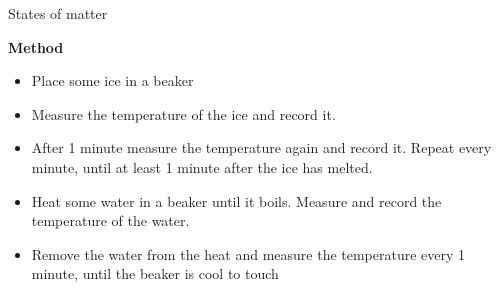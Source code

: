 \begin{fexperiment}{States of matter}
{\label{m38736*eip-862}\noindent{}\textbf{Method}
\label{m38736*id9872}\begin{itemize}[noitemsep]
            \item Place some ice in a beaker\item Measure the temperature of the ice and record it.\item After 1 minute measure the temperature again and record it. Repeat every minute, until at least 1 minute after the ice has melted.\item Heat some water in a beaker until it boils. Measure and record the temperature of the water.\item Remove the water from the heat and measure the temperature every 1 minute, until the beaker is cool to touch\end{itemize}

}
\end{fexperiment}

